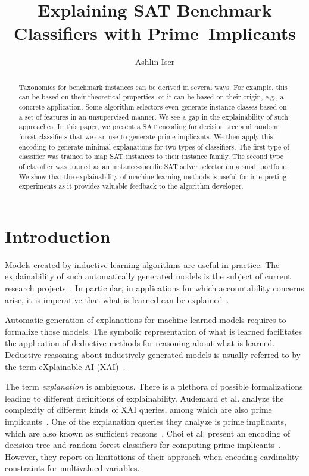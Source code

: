 \documentclass[a4paper, USenglish, cleveref, autoref, thm-restate]{lipics-v2021}
\title{Explaining SAT Benchmark Classifiers with Prime~Implicants}
\author{Ashlin Iser}{Karlsruhe Institute of Technology (KIT), Institute of Theoretical Informatics, Algorithm Engineering, Germany \and \url{https://algo2.iti.kit.edu/english/3986.php}}{ashlin.iser@kit.edu}{https://orcid.org/0000-0003-2904-232X}{}
\theoremstyle{definition}
\begin{document}
\maketitle
\begin{abstract}
Taxonomies for benchmark instances can be derived in several ways. For example, this can be based on their theoretical properties, or it can be based on their origin, e.g., a concrete application. 
Some algorithm selectors even generate instance classes based on a set of features in an unsupervised manner. 
We see a gap in the explainability of such approaches. 
In this paper, we present a SAT encoding for decision tree and random forest classifiers that we can use to generate prime implicants. 
We then apply this encoding to generate minimal explanations for two types of classifiers. 
The first type of classifier was trained to map SAT instances to their instance family.
The second type of classifier was trained as an instance-specific SAT solver selector on a small portfolio.
We show that the explainability of machine learning methods is useful for interpreting experiments as it provides valuable feedback to the algorithm developer.
\end{abstract}


\section{Introduction}

Models created by inductive learning algorithms are useful in practice.
The explainability of such automatically generated models is the subject of current research projects~\cite{Audemard:2021:Intelligibility, Darwiche:2020:Reasons}.
In particular, in applications for which accountability concerns arise, it is imperative that what is learned can be explained~\cite{Percy:2021:Accountability}. 

Automatic generation of explanations for machine-learned models requires to formalize those models. 
The symbolic representation of what is learned facilitates the application of deductive methods for reasoning about what is learned.
Deductive reasoning about inductively generated models is usually referred to by the term eXplainable AI (XAI)~\cite{Arrieta:2019:XAI}. 

The term \emph{explanation} is ambiguous. 
There is a plethora of possible formalizations leading to different definitions of explainability. 
Audemard et al. analyze the complexity of different kinds of XAI queries, among which are also prime implicants~\cite{Audemard:2020:XAI}. 
One of the explanation queries they analyze is prime implicants, which are also known as sufficient reasons~\cite{Darwiche:2020:Reasons}. 
Choi et al. present an encoding of decision tree and random forest classifiers for computing prime implicants~\cite{Choi:2020:RF}. 
However, they report on limitations of their approach when encoding cardinality constraints for multivalued variables. 
\end{document}
